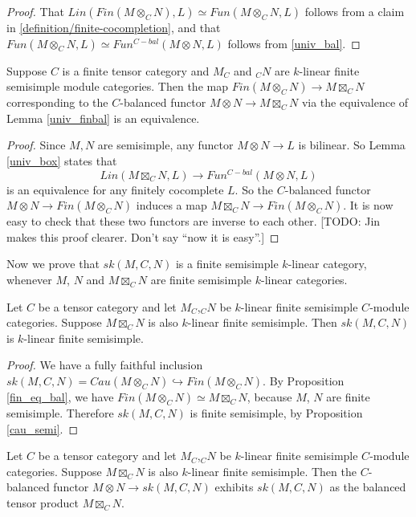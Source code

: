 \begin{proof}
  That $Lin(Fin(M\otimes_C N),L) \simeq Fun(M \otimes_{C} N, L)$ follows from
  a claim in \ref{definition/finite-cocompletion}, and that
  $Fun(M \otimes_{C} N, L) \simeq Fun^{C-bal}(M \otimes N, L)$ follows from
  \ref{univ_bal}.
\end{proof}

\begin{proposition}\label{fin_eq_bal}

  Suppose $C$ is a finite tensor category and $M_C$ and $_{C}N$ are $k$-linear finite
  semisimple module categories. Then the map
  $Fin(M\otimes_C N)\to M\boxtimes_C N$ corresponding to the $C$-balanced
  functor $M\otimes N\to M\boxtimes_C N$ via the equivalence of Lemma
  \ref{univ_finbal} is an equivalence.
\end{proposition}

\begin{proof}
  Since $M,N$ are semisimple, any functor $M\otimes N\to L$ is bilinear. So
  Lemma \ref{univ_box} states
  that \[Lin(M \boxtimes_{C} N, L) \to Fun^{C-bal}(M \otimes N, L)\] is an
  equivalence for any finitely cocomplete $L$. So the $C$-balanced functor
  $M\otimes N\to Fin(M\otimes_C N)$ induces a map
  $M\boxtimes_C N\to Fin(M\otimes_C N)$. It is now easy to check that these
  two functors are inverse to each other. [TODO: Jin makes this proof clearer. Don't say ``now it is easy''.]
\end{proof}

Now we prove that $sk(M,C,N)$ is a finite semisimple $k$-linear category,
whenever $M$, $N$ and $M\boxtimes_C N$ are finite semisimple $k$-linear
categories.

\begin{lemma}\label{semisimple}
  Let $C$ be a tensor category and let $M_C$,$_{C}N$ be $k$-linear finite semisimple $C$-module categories. Suppose $M\boxtimes_C N$ is also $k$-linear finite semisimple. Then $sk(M,C,N)$ is
  $k$-linear finite semisimple.
\end{lemma}

\begin{proof}
  We have a fully faithful inclusion
  $sk(M,C,N)=Cau(M\otimes_C N)\hookrightarrow Fin(M\otimes_C N)$. By
  Proposition \ref{fin_eq_bal}, we have
  $Fin(M\otimes_C N)\simeq M\boxtimes_C N$, because $M$, $N$ are finite
  semisimple. Therefore $sk(M,C,N)$ is finite semisimple, by Proposition
  \ref{cau_semi}.
\end{proof}

\begin{lemma}\label{sk_bal}
  Let $C$ be a tensor category and let $M_C$,$_{C}N$ be $k$-linear finite semisimple $C$-module categories. Suppose $M\boxtimes_C N$ is also $k$-linear finite semisimple. Then the
  $C$-balanced functor $M\otimes N\to sk(M,C,N)$ exhibits $sk(M,C,N)$ as the
  balanced tensor product $M\boxtimes_C N$.
\end{lemma}

